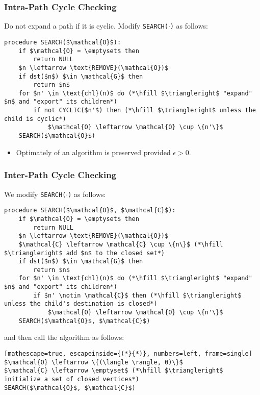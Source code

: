\subsubsection{Intra-Path Cycle Checking}
\begin{definition}
    Do not expand a path if it is cyclic. Modify \texttt{SEARCH($\cdot$)} as follows:

\begin{lstlisting}
procedure SEARCH($\mathcal{O}$):
    if $\mathcal{O} = \emptyset$ then
        return NULL
    $n \leftarrow \text{REMOVE}(\mathcal{O})$
    if dst($n$) $\in \mathcal{G}$ then
        return $n$
    for $n' \in \text{chl}(n)$ do (*\hfill $\triangleright$ "expand" $n$ and "export" its children*)
        if not CYCLIC($n'$) then (*\hfill $\triangleright$ unless the child is cyclic*)
            $\mathcal{O} \leftarrow \mathcal{O} \cup \{n'\}$
    SEARCH($\mathcal{O}$)
\end{lstlisting}
\begin{itemize}
    \item Optimately of an algorithm is preserved provided $\epsilon>0$.
\end{itemize}

\end{definition}

\subsubsection{Inter-Path Cycle Checking}
\begin{definition}
    We modify \texttt{SEARCH($\cdot$)} as follows:

\begin{lstlisting}
procedure SEARCH($\mathcal{O}$, $\mathcal{C}$):
    if $\mathcal{O} = \emptyset$ then
        return NULL
    $n \leftarrow \text{REMOVE}(\mathcal{O})$
    $\mathcal{C} \leftarrow \mathcal{C} \cup \{n\}$ (*\hfill $\triangleright$ add $n$ to the closed set*)
    if dst($n$) $\in \mathcal{G}$ then
        return $n$
    for $n' \in \text{chl}(n)$ do (*\hfill $\triangleright$ "expand" $n$ and "export" its children*)
        if $n' \notin \mathcal{C}$ then (*\hfill $\triangleright$ unless the child's destination is closed*)
            $\mathcal{O} \leftarrow \mathcal{O} \cup \{n'\}$
    SEARCH($\mathcal{O}$, $\mathcal{C}$)
\end{lstlisting}

and then call the algorithm as follows:

\begin{lstlisting}[mathescape=true, escapeinside={(*}{*)}, numbers=left, frame=single]
$\mathcal{O} \leftarrow \{(\langle \rangle, 0)\}$
$\mathcal{C} \leftarrow \emptyset$ (*\hfill $\triangleright$ initialize a set of closed vertices*)
SEARCH($\mathcal{O}$, $\mathcal{C}$)
\end{lstlisting}

\end{definition}

